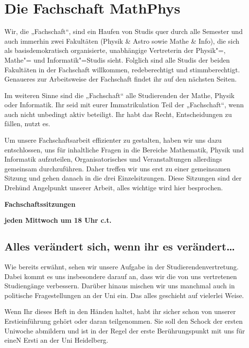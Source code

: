 \section{Die Fachschaft MathPhys}
Wir, die „Fachschaft“, sind ein Haufen von Studis quer durch alle Semester und
auch immerhin zwei Fakultäten (Physik \& Astro sowie Mathe \& Info), die sich
als basisdemokratisch organisierte, unabhängige Vertreterin der Physik"=,
Mathe"= und Informatik"=Studis sieht. Folglich sind alle Studis der beiden
Fakultäten in der Fachschaft willkommen, redeberechtigt und stimmberechtigt.
Genaueres zur Arbeitsweise der Fachschaft findet ihr auf den nächsten Seiten.

Im weiteren Sinne sind die „Fachschaft“ alle Studierenden der Mathe, Physik
oder Informatik. Ihr seid mit eurer Immatrikulation Teil der „Fachschaft“, wenn
auch nicht unbedingt aktiv beteiligt. Ihr habt das Recht, Entscheidungen zu
fällen, nutzt es.

Um unsere Fachschaftsarbeit effizienter zu gestalten, haben wir uns dazu
entschlossen, uns für inhaltliche Fragen in die Bereiche Mathematik, Physik und
Informatik aufzuteilen, Organisatorisches und Veranstaltungen allerdings
gemeinsam durchzuführen. Daher treffen wir uns erst zu einer gemeinsamen
Sitzung und gehen danach in die drei Einzelsitzungen.  Diese Sitzungen sind der
Dreh\= und Angelpunkt unserer Arbeit, alles wichtige wird hier besprochen.

\begin{center}
\large
\textbf{Fachschaftssitzungen}

\textbf{jeden Mittwoch um 18 Uhr \gls{c.t.}}
\end{center}


\subsection*{Alles verändert sich, wenn ihr es verändert\dots}
Wie bereits erwähnt, sehen wir unsere Aufgabe in der Studierendenvertretung.
Dabei kommt es uns insbesondere darauf an, dass wir die von uns vertretenen
Studiengänge verbessern. Darüber hinaus mischen wir uns manchmal auch in
politische Fragestellungen an der Uni ein. Das alles geschieht auf vielerlei
Weise.

Wenn Ihr dieses Heft in den Händen haltet, habt ihr sicher schon von unserer
Erstieinführung gehört oder daran teilgenommen. Sie soll den Schock der ersten
Uniwoche abmildern und ist in der Regel der erste Berührungspunkt mit uns für
eineN Ersti an der Uni Heidelberg.

